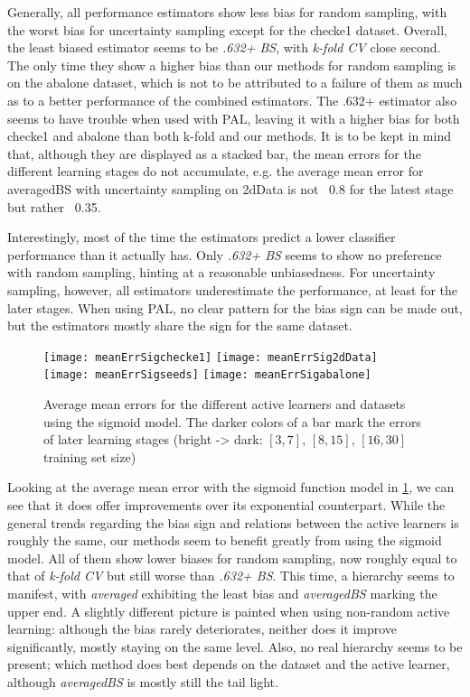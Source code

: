 Generally, all performance estimators show less bias for random sampling, with the worst bias for uncertainty sampling except for the checke1 dataset. Overall, the least biased estimator seems to be \textit{.632+ BS}, with \textit{k-fold CV} close second. The only time they show a higher bias than our methods for random sampling is on the abalone dataset, which is not to be attributed to a failure of them as much as to a better performance of the combined estimators. The .632+ estimator also seems to have trouble when used with PAL, leaving it with a higher bias for both checke1 and abalone than both k-fold and our methods. It is to be kept in mind that, although they are displayed as a stacked bar, the mean errors for the different learning stages do not accumulate, e.g. the average mean error for averagedBS with uncertainty sampling on 2dData is not ~0.8 for the latest stage but rather ~0.35.

Interestingly, most of the time the estimators predict a lower classifier performance than it actually has. Only \textit{.632+ BS} seems to show no preference with random sampling, hinting at a reasonable unbiasedness. For uncertainty sampling, however, all estimators underestimate the performance, at least for the later stages. When using PAL, no clear pattern for the bias sign can be made out, but the estimators mostly share the sign for the same dataset.

\begin{figure}[h]
	\centering
	\texttt{[image: meanErrSigchecke1]}
	\texttt{[image: meanErrSig2dData]}
	\texttt{[image: meanErrSigseeds]}
	\texttt{[image: meanErrSigabalone]}
	\caption{Average mean errors for the different active learners and datasets using the sigmoid model. The darker colors of a bar mark the errors of later learning stages (bright -> dark: $[3,7]$, $[8,15]$, $[16,30]$ training set size)}
	\label{fig:meanErrorsSig}
\end{figure}

Looking at the average mean error with the sigmoid function model in \ref{fig:meanErrorsSig}, we can see that it does offer improvements over its exponential counterpart. While the general trends regarding the bias sign and relations between the active learners is roughly the same, our methods seem to benefit greatly from using the sigmoid model. All of them show lower biases for random sampling, now roughly equal to that of \textit{k-fold CV} but still worse than \textit{.632+ BS}. This time, a hierarchy seems to manifest, with \textit{averaged} exhibiting the least bias and \textit{averagedBS} marking the upper end. A slightly different picture is painted when using non-random active learning: although the bias rarely deteriorates, neither does it improve significantly, mostly staying on the same level. Also, no real hierarchy seems to be present; which method does best depends on the dataset and the active learner, although \textit{averagedBS} is mostly still the tail light.

